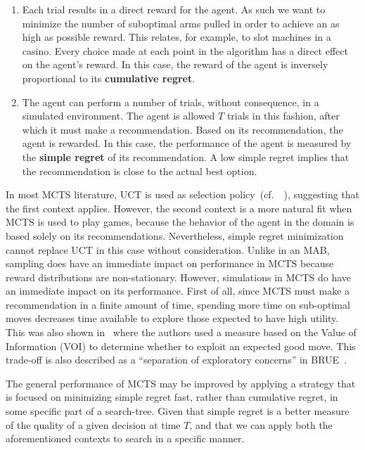 \documentclass{kecsmstr}
\newcommand{\cf}{{cf.}~}
\begin{document}
\begin{enumerate}

\item Each trial results in a direct reward for the agent. As such we want to minimize the number of suboptimal arms pulled in order to achieve an as high as possible reward. This relates, for example, to slot machines in a casino. Every choice made at each point in the algorithm has a direct effect on the agent's reward. In this case, the reward of the agent is inversely proportional to its \textbf{cumulative regret}.

\item The agent can perform a number of trials, without consequence, in a simulated environment. The agent is allowed $T$ trials in this fashion, after which it must make a recommendation. Based on its recommendation, the agent is rewarded. In this case, the performance of the agent is measured by the \textbf{simple regret} of its recommendation. A low simple regret implies that the recommendation is close to the actual best option.

\end{enumerate}

In most MCTS literature, UCT is used as selection policy~(\cf~), suggesting that the first context applies. However, the second context is a more natural fit when MCTS is used to play games, because the behavior of the agent in the domain is based solely on its recommendations. Nevertheless, simple regret minimization cannot replace UCT in this case without consideration. Unlike in an MAB, sampling does have an immediate impact on performance in MCTS because reward distributions are non-stationary. 
However, simulations in MCTS do have an immediate impact on its performance. First of all, since MCTS must make a recommendation in a finite amount of time, spending more time on sub-optimal moves decreases time available to explore those expected to have high utility. This was also shown in~ where the authors used a measure based on the Value of Information (VOI) to determine whether to exploit an expected good move. This trade-off is also described as a ``separation of exploratory concerns'' in BRUE~.

The general performance of MCTS may be improved by applying a strategy that is focused on minimizing simple regret fast, rather than cumulative regret, in some specific part of a search-tree. Given that simple regret is a better measure of the quality of a given decision at time $T$, and that we can apply both the aforementioned contexts to search in a specific manner. 
\end{document}
